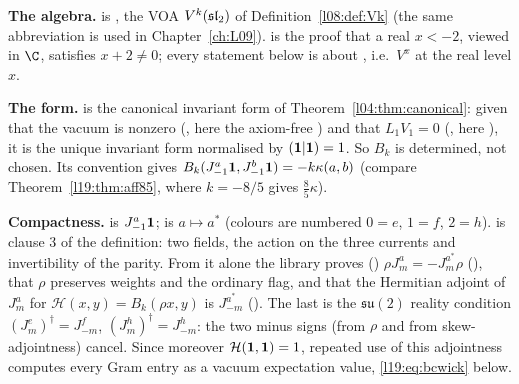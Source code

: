 \begin{dictionary}
\textbf{The algebra.}  is , the VOA $V^k(\mathfrak{sl}_2)$ of
Definition~\ref{l08:def:Vk} (the same abbreviation is used in Chapter~\ref{ch:L09}). 
is the proof that a real $x<-2$, viewed in $\C$, satisfies $x+2\ne0$; every statement below is about
, i.e.\ $V^x$ at the real level $x$.

\textbf{The form.}  is the canonical invariant form of
Theorem~\ref{l04:thm:canonical}: given that the vacuum is nonzero (, here the axiom-free
) and that $L_1V_1 = 0$ (, here ), it is the unique
invariant form normalised by $(\mathbf{1}|\mathbf{1}) = 1$. So $B_k$ is determined, not chosen. Its
convention gives $B_k(J^a_{-1}\mathbf{1},J^b_{-1}\mathbf{1}) = -k\kappa(a,b)$ (compare
Theorem~\ref{l19:thm:aff85}, where $k = -8/5$ gives $\tfrac85\kappa$).

\textbf{Compactness.}  is $J^a_{-1}\mathbf{1}$;  is $a\mapsto a^*$
(colours are numbered $0 = e$, $1 = f$, $2 = h$).  is clause 3 of the definition:
two fields, the action on the three currents and invertibility of the parity. From it alone the library proves
() $\rho J^a_m = -J^{a^*}_m\rho$ (), that $\rho$ preserves weights
and the ordinary flag, and that the Hermitian adjoint of $J^a_m$ for $\mathcal H(x,y) = B_k(\rho x,y)$ is $J^{a^*}_{-m}$
(). The last is the $\mathfrak{su}(2)$ reality condition $(J^e_m)^\dagger = J^f_{-m}$,
$(J^h_m)^\dagger = J^h_{-m}$: the two minus signs (from $\rho$ and from skew-adjointness) cancel. Since moreover
$\mathcal H(\mathbf{1},\mathbf{1}) = 1$, repeated use of this adjointness computes every Gram entry as a vacuum expectation
value, \eqref{l19:eq:bcwick} below.


\end{dictionary}
